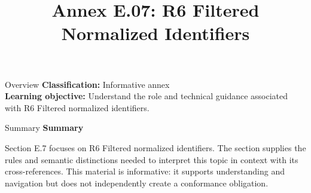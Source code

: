 \documentclass[10pt,letterpaper]{article}
\title{Annex E.07: R6 Filtered Normalized Identifiers}
\author{}
\date{}
\begin{document}
\maketitle
\begin{CornellOverviewBox}{Overview}
\textbf{Classification:} Informative annex\\[2pt]
\textbf{Learning objective:} Understand the role and technical guidance associated with R6 Filtered normalized identifiers.
\end{CornellOverviewBox}\begin{CornellSummaryBox}{Summary}
{\sffamily\bfseries\color{Accent} Summary}\par\vspace{3pt}Section E.7 focuses on R6 Filtered normalized identifiers. The section supplies the rules and semantic distinctions needed to interpret this topic in context with its cross-references. This material is informative: it supports understanding and navigation but does not independently create a conformance obligation.
\end{CornellSummaryBox}
\end{document}
